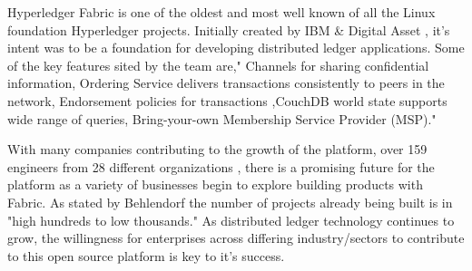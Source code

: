 Hyperledger Fabric is one of the oldest and most well known of all the 
Linux foundation Hyperledger projects. Initially created by IBM & Digital 
Asset , it’s intent was to be a foundation for developing distributed ledger 
applications. Some of the key features sited by the team are," Channels for 
sharing confidential information, Ordering Service delivers transactions 
consistently to peers in the network, Endorsement policies for transactions
,CouchDB world state supports wide range of queries, Bring-your-own Membership 
Service Provider (MSP)."\cite{Hyperledger Fabric}

With many companies contributing to the growth of the platform, over 159 engineers
from 28 different organizations \cite{Behlendorf Interview}, there is a promising
future for the platform as a variety of businesses begin to explore building products
with Fabric. As stated by Behlendorf the number of projects already being built is in
"high hundreds to low thousands." \cite{Behlendorf Interview} As distributed ledger
technology continues to grow, the willingness for enterprises across differing
industry/sectors to contribute to this open source platform is key to it's 
success.

